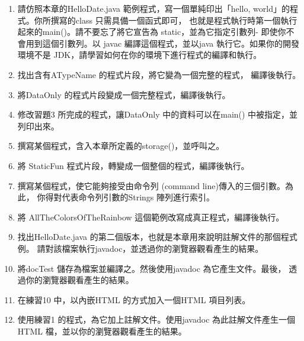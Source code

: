 \normalsize
\begin{enumerate}
\item 請仿照本章的HelloDate.java 範例程式，寫一個單純印出「hello,
world」的程式。你所撰寫的class 只需具備一個函式即可，
也就是程式執行時第一個執行起來的main()。請不要忘了將它宣告為
static，並為它指定引數列- 即使你不會用到這個引數列。以
javac 編譯這個程式，並以java 執行它。如果你的開發環境不是
JDK，請學習如何在你的環境下進行程式的編譯和執行。
\item 找出含有ATypeName 的程式片段，將它變為一個完整的程式，
編譯後執行。
\item 將DataOnly 的程式片段變成一個完整程式，編譯後執行。
\item 修改習題3 所完成的程式，讓DataOnly 中的資料可以在main()
中被指定，並列印出來。
\item 撰寫某個程式，含入本章所定義的storage()，並呼叫之。
\item 將 StaticFun 程式片段，轉變成一個整個的程式，編譯後執行。

\item 撰寫某個程式，使它能夠接受由命令列
(command line)傳入的三個引數。為此，
你得對代表命令列引數的Strings 陣列進行索引。
\item 將 AllTheColorsOfTheRainbow 這個範例改寫成真正程式，編譯後執行。
\item 找出HelloDate.java 的第二個版本，也就是本章用來說明註解文件的那個程式例。
請對該檔案執行javadoc，並透過你的瀏覽器觀看產生的結果。
\item 將docTest 儲存為檔案並編譯之。然後使用javadoc 為它產生文件。最後，
透過你的瀏覽器觀看產生的結果。
\item 在練習10 中，以內嵌HTML 的方式加入一個HTML 項目列表。
\item 使用練習1 的程式，為它加上註解文件。使用javadoc 為此註解文件產生一個
HTML 檔，並以你的瀏覽器觀看產生的結果。

\end{enumerate}
